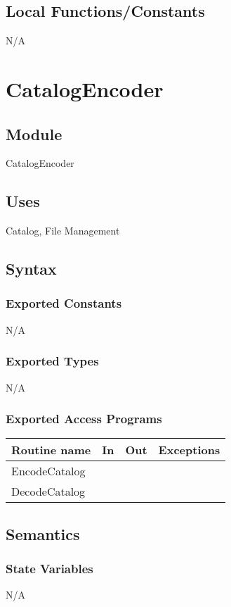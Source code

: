 \documentclass[12pt]{article}
\begin{document}
\subsection{Local Functions/Constants}
N/A

\newpage

\section{CatalogEncoder}

\subsection{Module}
CatalogEncoder

\subsection{Uses}
Catalog, File Management

\subsection{Syntax}
\subsubsection{Exported Constants}
N/A

\subsubsection{Exported Types}
N/A

\subsubsection{Exported Access Programs}
\begin{tabular}{| l | l | l | l |}
\hline
\textbf{Routine name} & \textbf{In} & \textbf{Out} & \textbf{Exceptions}\\
\hline
EncodeCatalog & & & \\
DecodeCatalog & & & \\
\hline
\end{tabular}

\subsection{Semantics}
\subsubsection{State Variables}
N/A
\end{document}

